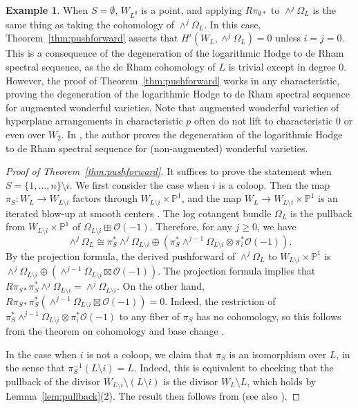 \documentclass{amsart}
\theoremstyle{definition}
\newtheorem{example}[theorem]{Example}
\begin{document}
\begin{example}\label{ex:degen}
When $S = \emptyset$, $W_{L^{\emptyset}}$ is a point, and applying $R \pi_{\emptyset *}$ to $\wedge^j \Omega_L$ is the same thing as taking the cohomology of $\wedge^j \Omega_L$. In this case, Theorem~\ref{thm:pushforward} asserts that $H^i(W_L, \wedge^j \Omega_L) = 0$ unless $i = j = 0$. This is a consequence of the degeneration of the logarithmic Hodge to de Rham spectral sequence, as the de Rham cohomology of $L$ is trivial except in degree $0$. However, the proof of Theorem~\ref{thm:pushforward} works in any characteristic, proving the degeneration of the logarithmic Hodge to de Rham spectral sequence for augmented wonderful varieties. Note that augmented wonderful varieties of hyperplane arrangements in characteristic $p$ often do not lift to characteristic $0$ or even over $W_2$. In \cite{LiuVanishing}, the author proves the degeneration of the logarithmic Hodge to de Rham spectral sequence for (non-augmented) wonderful varieties. 
\end{example}


\begin{proof}[Proof of Theorem~\ref{thm:pushforward}]
It suffices to prove the statement when $S = \{1, \dotsc, n\} \setminus 
i$. We first consider the case when $i$ is a coloop. Then the map $\pi_S 
\colon W_L \to W_{L \setminus i}$ factors through $W_{L \setminus i} 
\times \mathbb{P}^1$, and the map $W_L \to W_{L \setminus i} \times 
\mathbb{P}^1$ is an iterated blow-up at smooth centers \cite[Theorem 
1.3(2)]{LiLi}. The log cotangent bundle $\Omega_L$ is the pullback from 
$W_{L \setminus i} \times \mathbb{P}^1$ of $\Omega_{L \setminus i} 
\boxplus \mathcal{O}(-1)$. Therefore, for any $j \ge 0$, we have
$$\wedge^j \Omega_L \cong \pi_S^* \wedge^j \Omega_{L \setminus i} \oplus ( \pi_S^*\wedge^{j-1} \Omega_{L \setminus i} \otimes \pi_i^* \mathcal{O}(-1) ).$$
By the projection formula, the derived pushforward of $\wedge^j \Omega_L$ to $W_{L \setminus i} \times \mathbb{P}^1$ is $ \wedge^j \Omega_{L \setminus i} \oplus (\wedge^{j-1} \Omega_{L \setminus i} \boxtimes  \mathcal{O}(-1) )$. 
The projection formula implies that $R\pi_{S*}\pi_S^* \wedge^j \Omega_{L \setminus i} = \wedge^j \Omega_{L \setminus i}$. On the other hand,  $R\pi_{S*} \pi_S^*(\wedge^{j-1} \Omega_{L \setminus i} \boxtimes  \mathcal{O}(-1)) = 0$. Indeed, the restriction of $\pi_S^*\wedge^{j-1} \Omega_{L \setminus i} \otimes  \pi_i^*\mathcal{O}(-1)$ to any fiber of $\pi_S$ has no cohomology, so this follows from the theorem on cohomology and base change \cite[Theorem 25.1.6]{VakilNotes}. 

In the case when $i$ is not a coloop, we claim that $\pi_S$ is an isomorphism over $L$, in the sense that $\pi_S^{-1}(L \setminus i) = L$. Indeed, this is equivalent to checking that the pullback of the divisor $W_{L \setminus i} \setminus (L \setminus i)$ is the divisor $W_L \setminus L$, which holds by Lemma~\ref{lem:pullback}(2). 
The result then follows from \cite[Lemma 1.3 and Lemma 1.5]{EV} (see also \cite[Theorem 31.1]{HodgeIdeals}). 
\end{proof}
\end{document}
